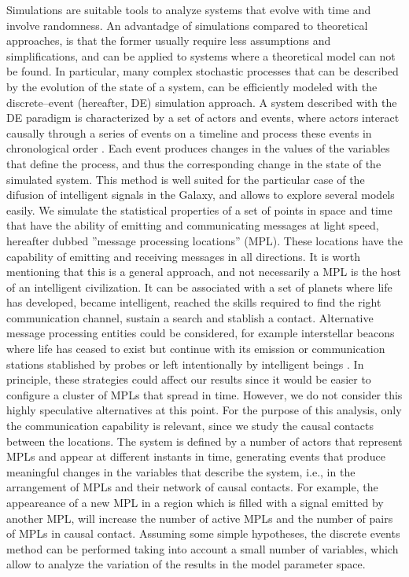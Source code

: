 Simulations are suitable tools to analyze systems that evolve with
time and involve randomness.
%
An advantadge of simulations compared to theoretical approaches, is
that the former usually require less assumptions and simplifications,
and can be applied to systems where a theoretical model can not be
found.
%
In particular, many complex stochastic processes that can be described
by the evolution of the state of a system, can be efficiently modeled
with the discrete--event (hereafter, DE) simulation approach.
%
A system described with the DE paradigm is characterized by a set of
actors and events, where actors interact causally through a series of
events on a timeline and process these events in chronological order
\citep{ptolemaeus_system_2014, chung_simulation_2003,
ross_simulation_2012}.
%
Each event produces changes in the values of the variables that define
the process, and thus the corresponding change in the state of the
simulated system.
%
This method is well suited for the particular case of the difusion of
intelligent signals in the Galaxy, and allows to explore several
models easily.
%
We simulate the statistical properties of a set of points in space and
time that have the ability of emitting and communicating messages at
light speed, hereafter dubbed ''message processing locations'' (MPL).
%
These locations have the capability of emitting and receiving messages
in all directions.
%
It is worth mentioning that this is a general approach, and not
necessarily a MPL is the host of an intelligent civilization.
%
It can be associated with a set of planets where life has developed,
became intelligent, reached the skills required to find the right
communication channel, sustain a search and stablish a contact.
%
Alternative message processing entities could be considered, for
example interstellar beacons where life has ceased to exist but
continue with its emission or communication stations stablished by
probes or left intentionally by intelligent beings \citep[see, e.g.,
][]{peters_outer_2018, barlow_galactic_2013}.
%
In principle, these strategies could affect our results since it would
be easier to configure a cluster of MPLs that spread in time.
%
However, we do not consider this highly speculative alternatives at
this point.
%
%
For the purpose of this analysis, only the communication capability is
relevant, since we study the causal contacts between the locations.
%
%
The system is defined by a number of actors that represent MPLs and
appear at different instants in time, generating events that produce
meaningful changes in the variables that describe the system, i.e., in
the arrangement of MPLs and their network of causal contacts.
%
For example, the appeareance of a new MPL in a region which is filled
with a signal emitted by another MPL, will increase the number of
active MPLs and the number of pairs of MPLs in causal contact.
%
Assuming some simple hypotheses, the discrete events method can be
performed taking into account a small number of variables, which allow
to analyze the variation of the results in the model parameter space.


